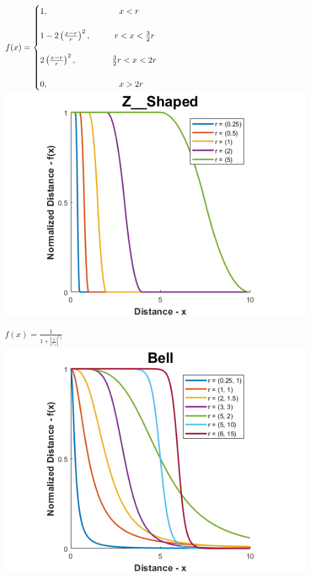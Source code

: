 \documentclass[12pt, a4paper, titlepage, openany]{book}
\begin{document}
\begin{description}[labelsep=1cm, labelwidth=2cm, nosep,style=multiline,leftmargin=3cm]
\begin{description}[labelsep=14em, labelwidth=10em, nosep,style=multiline,leftmargin=6cm]
	\item[\texttt{"z\_shaped"}]	 $f(x) = \begin{cases} 1, \hspace{30mm}  x<r \\ \
	\\ 1 - 2 \left( \frac{x-r}{r}\right)^{2},  \hspace{10mm} r<x<\frac{3}{2}r \\ \
	\\ 2 \left( \frac{x-r}{r}\right)^{2},  \hspace{15mm} \frac{3}{2}r<x<2r \\ \
	\\ 0,  \hspace{30mm}  x>2r \end{cases}$ \\
		\includegraphics[scale=.5]{FuzzZSv1.png} \\
		
	\item[\texttt{"bell"}] $f\left( x \right) = \frac{1}{1+{\left |\frac{x}{r_1 }\right|}^{r_2 } }$ \\ 
		\includegraphics[scale=.5]{FuzzBv1.png}\\
				

\end{description}
\end{description}
\end{document}
